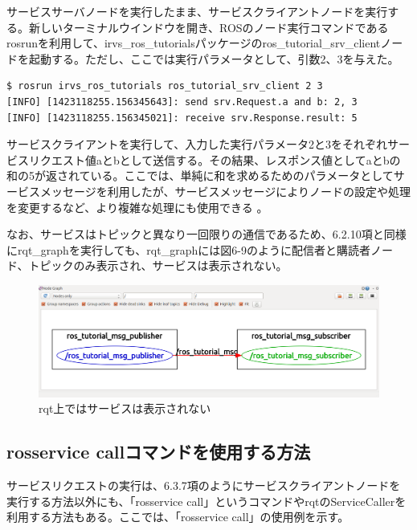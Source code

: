 サービスサーバノードを実行したまま、サービスクライアントノードを実行する。新しいターミナルウインドウを開き、ROSのノード実行コマンドであるrosrunを利用して、irvs\_ros\_tutorialsパッケージのros\_tutorial\_srv\_clientノードを起動する。ただし、ここでは実行パラメータとして、引数2、3を与えた。

\begin{lstlisting}[language=ROS]
$ rosrun irvs_ros_tutorials ros_tutorial_srv_client 2 3
[INFO] [1423118255.156345643]: send srv.Request.a and b: 2, 3
[INFO] [1423118255.156345021]: receive srv.Response.result: 5
\end{lstlisting}

サービスクライアントを実行して、入力した実行パラメータ2と3をそれぞれサービスリクエスト値aとbとして送信する。その結果、レスポンス値としてaとbの和の5が返されている。ここでは、単純に和を求めるためのパラメータとしてサービスメッセージを利用したが、サービスメッセージによりノードの設定や処理を変更するなど、より複雑な処理にも使用できる  。

なお、サービスはトピックと異なり一回限りの通信であるため、6.2.10項と同様にrqt\_graphを実行しても、rqt\_graphには図6-9のように配信者と購読者ノード、トピックのみ表示され、サービスは表示されない。

\begin{figure}[htp]
  \centering
  \includegraphics[width=\columnwidth]{pictures/chapter6/pic_06_09.png}
  \caption{rqt上ではサービスは表示されない}
\end{figure}

\subsection{rosservice callコマンドを使用する方法}

サービスリクエストの実行は、6.3.7項のようにサービスクライアントノードを実行する方法以外にも、「rosservice call」というコマンドやrqtのServiceCallerを利用する方法もある。ここでは、「rosservice call」の使用例を示す。

